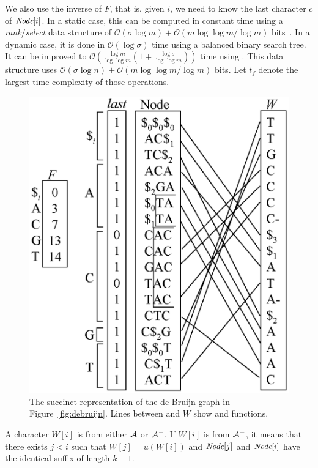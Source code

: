\documentclass{llncs}
\newcommand{\Order}{\mathcal{O}}
\def\rank{\textit{rank}}
\def\select{\textit{select}}
\begin{document}
We also use the inverse of $F$, that is, given $i$, we need to know the last character $c$
of ${\textit{Node}}[i]$.  In a static case, this can be
computed in constant time using a {\rank}/{\select} data structure of
$\Order(\sigma \log m) + \Order(m \log\log m/\log m)$ bits~\cite{RRR07}.
In a dynamic case, it is done in $\Order(\log \sigma)$ time using a balanced
binary search tree.
%
It can be improved to $\Order(\frac{\log m }{\log \log m}
(1+\frac{\log\sigma}{\log\log m}))$ time using \cite{NavSad10}.
This data structure uses
$\Order(\sigma \log n) + \Order(m \log \log m/\log m)$ bits.
%
Let $t_f$ denote the largest time complexity of those operations.


\begin{figure}[bt]
\begin{center}
  \includegraphics[scale=0.70]{fig4.eps}
\caption{The succinct representation of the de Bruijn graph in Figure~\ref{fig:debruijn}.
Lines between {\Node} and $W$ show {\fwd} and {\bwd} functions.
}
\label{fig:succinctdebruijn}
\end{center}
\end{figure}


A character $W[i]$ is from either ${\cal A}$ or ${\cal A}^-$.
If $W[i]$ is from ${\cal A}^-$, it means that there exists $j < i$ such that
$W[j] = u(W[i])$ and ${\textit{Node}}[j]$ and ${\textit{Node}}[i]$ have the identical suffix of length $k-1$.
\end{document}
